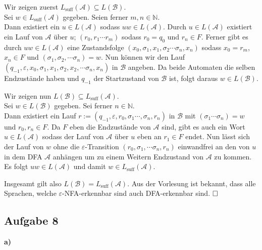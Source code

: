 \documentclass[a4paper,graphics,11pt]{article}
\newcommand{\aufgabe}[1]{\subsection*{Aufgabe #1}}
\begin{document}
Wir zeigen zuerst $L_{\text{suff}}(\mathcal{A}) \subseteq L(\mathcal{B})$.\\[2pt]
Sei $w \in L_{\text{suff}}(\mathcal{A})$ gegeben. Seien ferner $m,n \in \mathbb{N}$.\\
Dann existiert ein $u \in L(\mathcal{A})$ sodass $uw \in L(\mathcal{A})$.
Durch $u \in L(\mathcal{A})$ existiert ein Lauf von $\mathcal{A}$ über $u$;
$(r_0, r_1 \cdots r_m)$ sodass $r_0 = q_0$ und $r_n \in F$.
Ferner gibt es durch $uw \in L(\mathcal{A})$ eine Zustandsfolge
$(x_0, \sigma_1, x_1, \sigma_2 \cdots \sigma_n, x_n)$ sodass $x_0 = r_m$, $x_n \in F$ und
$(\sigma_1, \sigma_2, \cdots \sigma_n) = w$. Nun können wir den Lauf $(q_{-1}, \varepsilon, x_0, \sigma_1, x_1, \sigma_2, x_2, \cdots \sigma_n, x_n)$ in $\mathcal{B}$ angeben. Da beide
Automaten die selben Endzustände haben und $q_{-1}$ der Startzustand von $\mathcal{B}$ ist, folgt daraus $w \in L(\mathcal{B})$.
\newpage

Wir zeigen nun $L(\mathcal{B}) \subseteq L_{\text{suff}}(\mathcal{A})$.\\[2pt]
Sei $w \in L(\mathcal{B})$ gegeben. Sei ferner $n \in \mathbb{N}$.\\
Dann existiert ein Lauf $r := (q_{-1}, \varepsilon, r_0, \sigma_1 \cdots, \sigma_n, r_n)$
in $\mathcal{B}$ mit $(\sigma_1 \cdots \sigma_n) = w$ und $r_0, r_n \in F$.
Da $F$ eben die Endzustände von $\mathcal{A}$ sind, gibt es auch ein Wort $u \in L(\mathcal{A})$ sodass der Lauf von $\mathcal{A}$ über $u$ eben an $r_1 \in F$ endet. Nun lässt sich der Lauf
von $w$ ohne die $\varepsilon$-Transition $(r_0, \sigma_1, \cdots \sigma_n, r_n)$ einwandfrei
an den von $u$ in dem DFA $\mathcal{A}$ anhängen um zu einem Weitern Endzustand von $\mathcal{A}$ zu kommen. Es folgt $uw \in L(\mathcal{A})$ und damit $w \in L_{\text{suff}}(\mathcal{A})$.

Insgesamt gilt also $L(\mathcal{B}) = L_{\text{suff}}(\mathcal{A})$. Aus der Vorlesung ist
bekannt, dass alle Sprachen, welche $\varepsilon$-NFA-erkennbar sind auch DFA-erkennbar sind.
$\hfill\square$

\aufgabe{8}
\textbf{a)}\\

\end{document}
